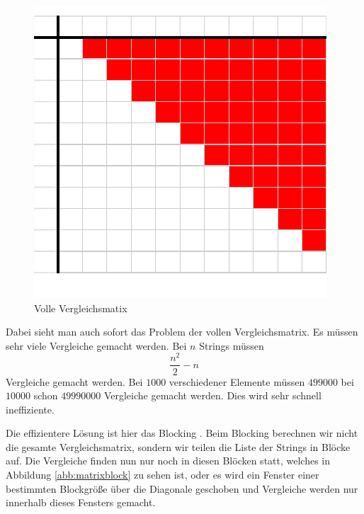 \documentclass[sigconf]{acmart}
\begin{document}
\begin{figure}[htbp]
  \centering
  \includegraphics{table.pdf}
  \caption{Volle Vergleichsmatix}
  \label{abb:matrix}
\end{figure}

Dabei sieht man auch sofort das Problem der vollen Vergleichsmatrix.
Es müssen sehr viele Vergleiche gemacht werden. Bei $n$
Strings müssen
$$\frac{n^2}{2} - n$$
Vergleiche gemacht werden.
Bei $1000$ verschiedener
Elemente müssen $499000$ bei $10000$ schon $49990000$ Vergleiche
gemacht werden. Dies wird sehr schnell ineffiziente.

Die effizientere Lösung ist hier das Blocking \cite[Vlg. S. 11]{elmagarmid1}.
Beim Blocking berechnen wir nicht die gesamte
Vergleichsmatrix, sondern wir teilen die Liste der Strings
in Blöcke auf. Die Vergleiche finden nun nur noch in diesen
Blöcken statt, welches in Abbildung \ref{abb:matrixblock} zu sehen ist,
oder es wird ein Fenster einer bestimmten Blockgröße über die
Diagonale geschoben und Vergleiche werden nur innerhalb
dieses Fensters gemacht.
\end{document}
